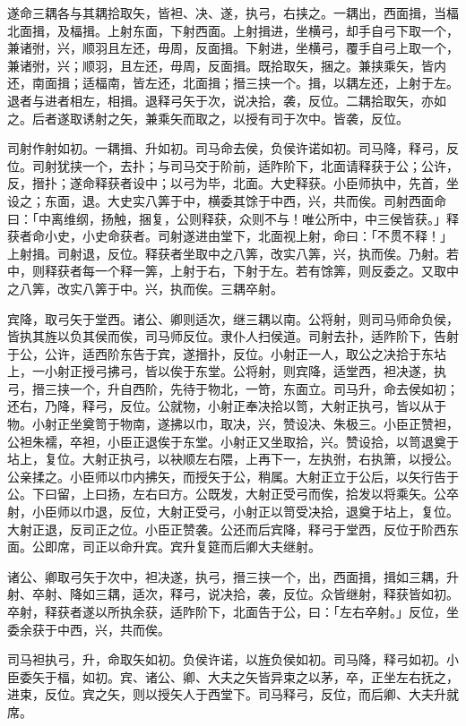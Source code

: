 \documentclass[]{article}
\begin{document}
遂命三耦各与其耦拾取矢，皆袒、决、遂，执弓，右挟之。一耦出，西面揖，当楅北面揖，及楅揖。上射东面，下射西面。上射揖进，坐横弓，却手自弓下取一个，兼诸弣，兴，顺羽且左还，毋周，反面揖。下射进，坐横弓，覆手自弓上取一个，兼诸弣，兴；顺羽，且左还，毋周，反面揖。既拾取矢，捆之。兼挟乘矢，皆内还，南面揖；适楅南，皆左还，北面揖；搢三挟一个。揖，以耦左还，上射于左。退者与进者相左，相揖。退释弓矢于次，说决拾，袭，反位。二耦拾取矢，亦如之。后者遂取诱射之矢，兼乘矢而取之，以授有司于次中。皆袭，反位。

司射作射如初。一耦揖、升如初。司马命去侯，负侯许诺如初。司马降，释弓，反位。司射犹挟一个，去扑；与司马交于阶前，适阼阶下，北面请释获于公；公许，反，搢扑；遂命释获者设中；以弓为毕，北面。大史释获。小臣师执中，先首，坐设之；东面，退。大史实八筭于中，横委其馀于中西，兴，共而俟。司射西面命曰：「中离维纲，扬触，捆复，公则释获，众则不与！唯公所中，中三侯皆获。」释获者命小史，小史命获者。司射遂进由堂下，北面视上射，命曰：「不贯不释！」上射揖。司射退，反位。释获者坐取中之八筭，改实八筭，兴，执而俟。乃射。若中，则释获者每一个释一筭，上射于右，下射于左。若有馀筭，则反委之。又取中之八筭，改实八筭于中。兴，执而俟。三耦卒射。

宾降，取弓矢于堂西。诸公、卿则适次，继三耦以南。公将射，则司马师命负侯，皆执其旌以负其侯而俟，司马师反位。隶仆人扫侯道。司射去扑，适阼阶下，告射于公，公许，适西阶东告于宾，遂搢扑，反位。小射正一人，取公之决拾于东坫上，一小射正授弓拂弓，皆以俟于东堂。公将射，则宾降，适堂西，袒决遂，执弓，搢三挟一个，升自西阶，先待于物北，一笴，东面立。司马升，命去侯如初；还右，乃降，释弓，反位。公就物，小射正奉决拾以笥，大射正执弓，皆以从于物。小射正坐奠笥于物南，遂拂以巾，取决，兴，赞设决、朱极三。小臣正赞袒，公袒朱襦，卒袒，小臣正退俟于东堂。小射正又坐取拾，兴。赞设拾，以笥退奠于坫上，复位。大射正执弓，以袂顺左右隈，上再下一，左执弣，右执箫，以授公。公亲揉之。小臣师以巾内拂矢，而授矢于公，稍属。大射正立于公后，以矢行告于公。下曰留，上曰扬，左右曰方。公既发，大射正受弓而俟，拾发以将乘矢。公卒射，小臣师以巾退，反位，大射正受弓，小射正以笥受决拾，退奠于坫上，复位。大射正退，反司正之位。小臣正赞袭。公还而后宾降，释弓于堂西，反位于阶西东面。公即席，司正以命升宾。宾升复筵而后卿大夫继射。

诸公、卿取弓矢于次中，袒决遂，执弓，搢三挟一个，出，西面揖，揖如三耦，升射、卒射、降如三耦，适次，释弓，说决拾，袭，反位。众皆继射，释获皆如初。卒射，释获者遂以所执余获，适阼阶下，北面告于公，曰：「左右卒射。」反位，坐委余获于中西，兴，共而俟。

司马袒执弓，升，命取矢如初。负侯许诺，以旌负侯如初。司马降，释弓如初。小臣委矢于楅，如初。宾、诸公、卿、大夫之矢皆异束之以茅，卒，正坐左右抚之，进束，反位。宾之矢，则以授矢人于西堂下。司马释弓，反位，而后卿、大夫升就席。
\end{document}
